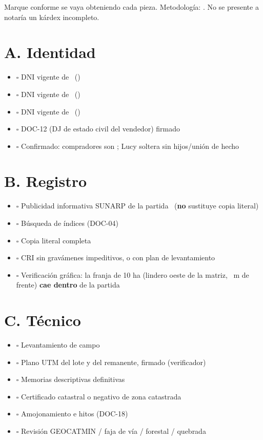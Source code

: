 \documentclass[12pt,a4paper]{article}
\begin{document}


\noindent Marque conforme se vaya obteniendo cada pieza. Metodología: \textbf{\Metodologia}. No se presente a notaría un kárdex incompleto.

\section*{A. Identidad}
\begin{itemize}[leftmargin=0.9cm]
\item $\square$ DNI vigente de \VendedorNombreCompleto\ (\VendedorDNI)
\item $\square$ DNI vigente de \CompradorUnoNombre\ (\CompradorUnoDNI)
\item $\square$ DNI vigente de \CompradorDosNombre\ (\CompradorDosDNI)
\item $\square$ DOC-12 (DJ de estado civil del vendedor) firmado
\item $\square$ Confirmado: compradores son \CompradorParentesco; Lucy soltera sin hijos/unión de hecho
\end{itemize}

\section*{B. Registro}
\begin{itemize}[leftmargin=0.9cm]
\item $\square$ Publicidad informativa SUNARP de la partida \PartidaMatriz\ (\textbf{no} sustituye copia literal)
\item $\square$ Búsqueda de índices (DOC-04)
\item $\square$ Copia literal completa
\item $\square$ CRI sin gravámenes impeditivos, o con plan de levantamiento
\item $\square$ Verificación gráfica: la franja de 10 ha (lindero oeste de la matriz, \FrenteM\ m de frente) \textbf{cae dentro} de la partida
\end{itemize}

\section*{C. Técnico}
\begin{itemize}[leftmargin=0.9cm]
\item $\square$ Levantamiento de campo
\item $\square$ Plano UTM del lote y del remanente, firmado (verificador)
\item $\square$ Memorias descriptivas definitivas
\item $\square$ Certificado catastral o negativo de zona catastrada
\item $\square$ Amojonamiento e hitos (DOC-18)
\item $\square$ Revisión GEOCATMIN / faja de vía / forestal / quebrada
\end{itemize}
\end{document}

